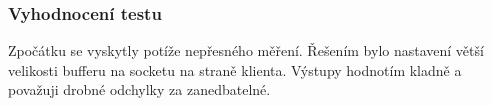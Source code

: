 \subsubsection*{Vyhodnocení testu}
Zpočátku se vyskytly potíže nepřesného měření. Řešením bylo nastavení větší velikosti bufferu na socketu na straně klienta. Výstupy hodnotím kladně a považuji drobné odchylky za zanedbatelné.
